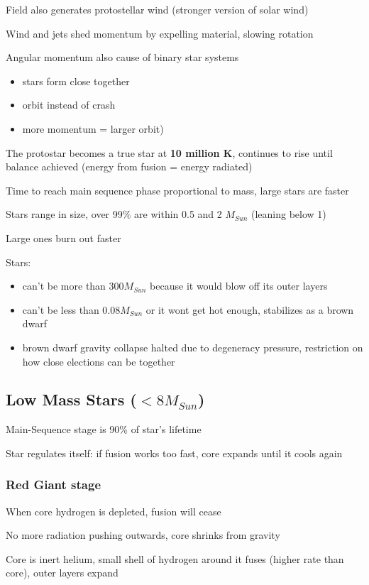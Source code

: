 Field also generates protostellar wind (stronger version of solar wind)

Wind and jets shed momentum by expelling material, slowing rotation

Angular momentum also cause of binary star systems
\begin{itemize}
\item stars form close together
\item orbit instead of crash
\item more momentum = larger orbit)
\end{itemize}

The protostar becomes a true star at {\bf 10 million K}, continues to rise until balance achieved (energy from fusion = energy radiated)

Time to reach main sequence phase proportional to mass, large stars are faster

Stars range in size, over 99\% are within 0.5 and 2 $M_{Sun}$ (leaning below 1)

Large ones burn out faster

Stars:
\begin{itemize}
\item can't be more than $300 M_{Sun}$ because it would blow off its outer layers
\item can't be less than $0.08 M_{Sun}$ or it wont get hot enough, stabilizes as a brown dwarf
\item brown dwarf gravity collapse halted due to degeneracy pressure, restriction on how close elections can be together
\end{itemize}

\subsection{Low Mass Stars ($<8 M_{Sun}$)}
Main-Sequence stage is 90\% of star's lifetime

Star regulates itself: if fusion works too fast, core expands until it cools again

\subsubsection{Red Giant stage}
When core hydrogen is depleted, fusion will cease

No more radiation pushing outwards, core shrinks from gravity

Core is inert helium, small shell of hydrogen around it fuses (higher rate than core), outer layers expand

